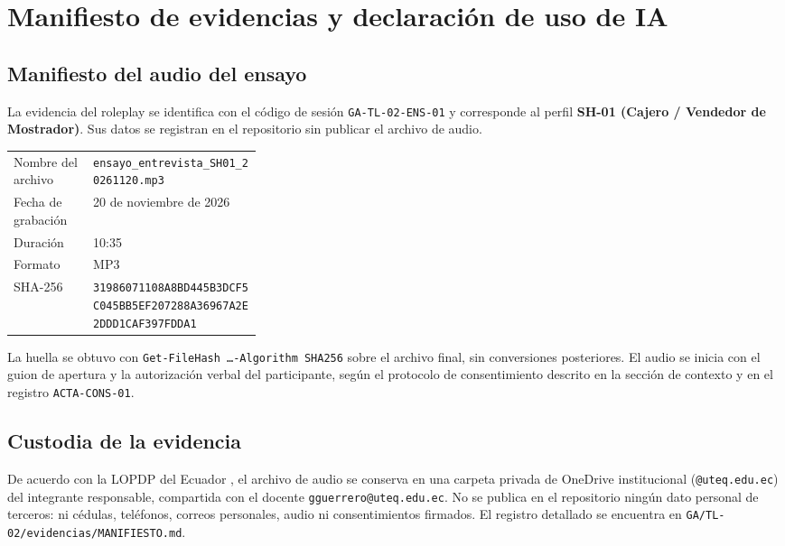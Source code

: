 \section{Manifiesto de evidencias y declaraci\'on de uso de IA}

\subsection{Manifiesto del audio del ensayo}

La evidencia del roleplay se identifica con el c\'odigo de sesi\'on \texttt{GA-TL-02-ENS-01}
y corresponde al perfil \textbf{SH-01 (Cajero / Vendedor de Mostrador)}. Sus datos se
registran en el repositorio sin publicar el archivo de audio.

\noindent\begin{tabularx}{\linewidth}{|p{0.32\linewidth}|Y|}
\hline
{} & \\
\hline
Nombre del archivo & \texttt{ensayo\_entrevista\_SH01\_20261120.mp3}\\
\hline
{} Fecha de grabaci\'on & 20 de noviembre de 2026\\
\hline
Duraci\'on & 10:35\\
\hline
{} Formato & MP3\\
\hline
SHA-256 & \texttt{\footnotesize 31986071108A8BD445B3DCF5C045BB5EF207288A36967A2E2DDD1CAF397FDDA1}\\
\hline
\end{tabularx}

\vspace{4pt}
La huella se obtuvo con \texttt{Get-FileHash \ldots -Algorithm SHA256} sobre el archivo
final, sin conversiones posteriores. El audio se inicia con el guion de apertura y la
autorizaci\'on verbal del participante, seg\'un el protocolo de consentimiento descrito en
la secci\'on de contexto y en el registro \texttt{ACTA-CONS-01}.

\subsection{Custodia de la evidencia}

De acuerdo con la LOPDP del Ecuador \cite{lopdp2021}, el archivo de audio se conserva en
una carpeta privada de OneDrive institucional (\texttt{@uteq.edu.ec}) del integrante
responsable, compartida con el docente \texttt{gguerrero@uteq.edu.ec}. No se publica en el
repositorio ning\'un dato personal de terceros: ni c\'edulas, tel\'efonos, correos personales,
audio ni consentimientos firmados. El registro detallado se encuentra en
\texttt{GA/TL-02/evidencias/MANIFIESTO.md}.

